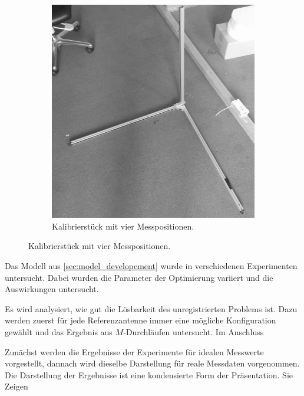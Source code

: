 \begin{figure}[ht!]
\begin{subfigure}[t]{0.4\textwidth}
                 \includegraphics[width=\textwidth]{img/Calibration_Phantom.png}
                 \caption{Kalibrierstück mit vier Messpositionen. }
                 \label{fig:calib_piece}
         \end{subfigure}
         \label{fig:Calibration_Tools}
\end{figure}

%

Das Modell aus \ref{sec:model_developement} wurde in verschiedenen Experimenten untersucht. Dabei wurden die Parameter der Optimierung variiert und die Auswirkungen untersucht.

Es wird analysiert, wie gut die Lösbarkeit des unregistrierten Problems ist. Dazu werden zuerst für jede Referenzantenne immer eine mögliche Konfiguration gewählt und das Ergebnis aus $M$-Durchläufen untersucht. Im Anschluss %

Zunächst werden die Ergebnisse der Experimente für idealen Messwerte vorgestellt, dannach wird dieselbe Darstellung für reale Messdaten vorgenommen. Die Darstellung der Ergebnisse ist eine kondensierte Form der Präsentation. Sie Zeigen 
%
%
